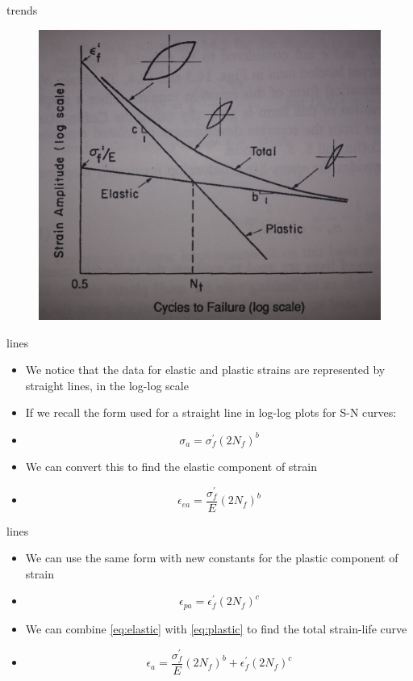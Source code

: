 \documentclass[10pt]{beamer}
\begin{document}
\begin{frame}{trends}
	\begin{figure}
	\centering
	\includegraphics[width=0.7\linewidth]{../Figures/elastic-plastic}
	\label{fig:elastic-plastic}
	\end{figure}
\end{frame}

\begin{frame}{lines}
	\begin{itemize}[<+->]
		\item We notice that the data for elastic and plastic strains are represented by straight lines, in the log-log scale
		\item If we recall the form used for a straight line in log-log plots for S-N curves:
		\item[] \begin{equation}
		\sigma_a = \sigma_f^\prime (2N_f)^b
		\end{equation}
		\item We can convert this to find the elastic component of strain
		\item[] \begin{equation}
		\label{eq:elastic}
		\epsilon_{ea} = \frac{\sigma_f^\prime}{E} (2N_f)^b
		\end{equation}
	\end{itemize}
\end{frame}

\begin{frame}{lines}
	\begin{itemize}[<+->]
		\item We can use the same form with new constants for the plastic component of strain
		\item[]\begin{equation}
		\label{eq:plastic}
		\epsilon_{pa} = \epsilon_f^\prime (2 N_f)^c
		\end{equation}
		\item We can combine \ref{eq:elastic} with \ref{eq:plastic} to find the total strain-life curve
		\item[] \begin{equation}
		\epsilon_a = \frac{\sigma_f^\prime}{E} (2N_f)^b + \epsilon_f^\prime (2 N_f)^c
		\end{equation}
	\end{itemize}
\end{frame}
\end{document}
